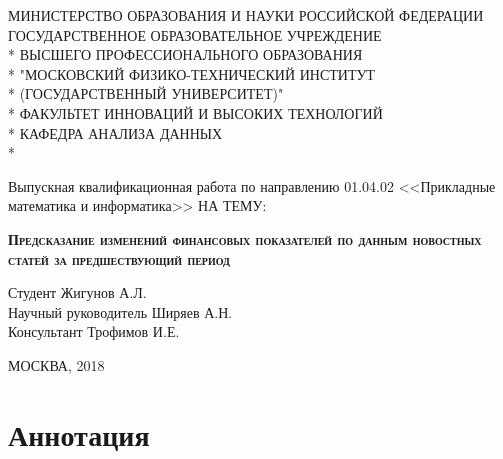 \documentclass[14pt,a4paper]{extreport}
\begin{document}
\begin{titlepage}

\newpage

\begin{center}
МИНИСТЕРСТВО ОБРАЗОВАНИЯ И НАУКИ РОССИЙСКОЙ ФЕДЕРАЦИИ \\
\vspace{0.5cm}
ГОСУДАРСТВЕННОЕ ОБРАЗОВАТЕЛЬНОЕ УЧРЕЖДЕНИЕ \\*
ВЫСШЕГО ПРОФЕССИОНАЛЬНОГО ОБРАЗОВАНИЯ\\*
"МОСКОВСКИЙ ФИЗИКО-ТЕХНИЧЕСКИЙ ИНСТИТУТ \\*
(ГОСУДАРСТВЕННЫЙ УНИВЕРСИТЕТ)" \\*
\vspace{0.5cm}
ФАКУЛЬТЕТ ИННОВАЦИЙ И ВЫСОКИХ ТЕХНОЛОГИЙ \\*
КАФЕДРА АНАЛИЗА ДАННЫХ \\*
\hrulefill
\end{center}


\vspace{3em}

\begin{center}
\Large Выпускная квалификационная работа по направлению 01.04.02 <<Прикладные математика и информатика>> \linebreak НА ТЕМУ:
\end{center}

\vspace{2em}

\begin{center}
\textsc{\large{\textbf{Предсказание изменений финансовых показателей по данным новостных статей за предшествующий период}}}
\end{center}

\begin{flushleft}
Студент \hrulefill Жигунов А.Л. \\
\vspace{1.5em}
Научный руководитель \hrulefill Ширяев А.Н.\\
\vspace{1.5em}
Консультант \hrulefill Трофимов И.Е.
\end{flushleft}

\vspace{\fill}

\begin{center}
МОСКВА, 2018
\end{center}

\end{titlepage}

\section{Аннотация}
\end{document}
